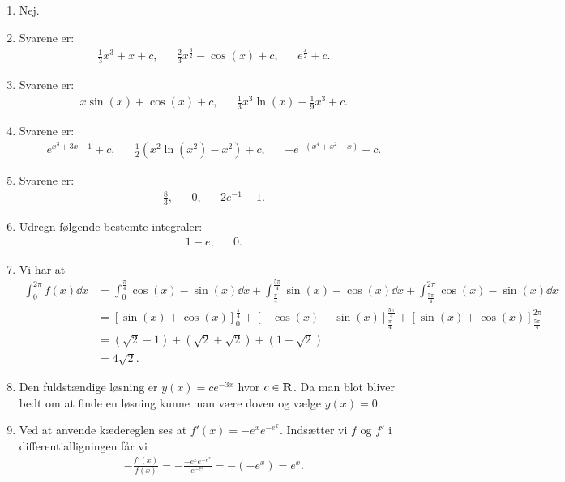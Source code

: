 \begin{enumerate}
	
	\item Nej.
	

	\item Svarene er:
	\begin{align*}
	\frac{1}{3}x^3+x+c,&& \frac{2}{3}x^{\frac{3}{2}}-\cos(x)+c,&& e^{\frac{x}{2}}+c.
	\end{align*}

	\item Svarene er:
	\begin{align*}
	x\sin(x)+\cos(x)+c,&& \frac{1}{3}x^3\ln(x)-\frac{1}{9}x^3+c.
	\end{align*}
	
	\item Svarene er:
	\begin{align*}
	e^{x^3+3x-1}+c,&& \frac{1}{2}(x^2\ln(x^2)-x^2)+c, && -e^{-(x^4+x^2-x)}+c.
	\end{align*}
	
	\item Svarene er:
	\begin{align*}
	\frac{8}{3},&& 0,&& 2e^{-1}-1.
	\end{align*}
	
	\item Udregn følgende bestemte integraler:
	\begin{align*}
	1-e,&& 0.
	\end{align*}
	
	\item\label{it:rep2ans} Vi har at
	\begin{align*}
	\int_0^{2\pi} f(x)\dd x&=\int_0^{\frac{\pi}{4}} \cos(x)-\sin(x) \dd x+\int_{\frac{\pi}{4}}^{\frac{5\pi}{4}} \sin(x)-\cos(x)\dd x+\int_{\frac{5\pi}{4}}^{2\pi} \cos(x)-\sin(x)\dd x\\
	&=[\sin(x)+\cos(x)]_{0}^{\frac{\pi}{4}}+[-\cos(x)-\sin(x)]_{\frac{\pi}{4}}^{\frac{5\pi}{4}}+[\sin(x)+\cos(x)]_{\frac{5\pi}{4}}^{2\pi}\\
	&=(\sqrt{2}-1)+(\sqrt{2}+\sqrt{2})+(1+\sqrt{2})\\
	&=4\sqrt{2}.
	\end{align*}
	
	\item Den fuldstændige løsning er $y(x)=ce^{-3x}$ hvor $c\in \mathbf{R}$. Da man blot bliver bedt om at finde en løsning kunne man være doven og vælge $y(x)=0$.
	
	\item Ved at anvende kædereglen ses at $ f'(x)=-e^x e^{-e^x} $. Indsætter vi $f$ og $f'$ i differentialligningen får vi
	\begin{align*}
	-\frac{f'(x)}{f(x)}=-\frac{-e^xe^{-e^x}}{e^{-e^x}}=-(-e^x)=e^x.
	\end{align*}
	

\end{enumerate}

